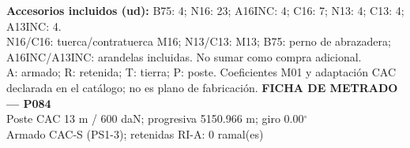 \begingroup\scriptsize
\textbf{Accesorios incluidos (ud):} B75: 4; N16: 23; A16INC: 4; C16: 7; N13: 4; C13: 4; A13INC: 4.\\
N16/C16: tuerca/contratuerca M16; N13/C13: M13; B75: perno de abrazadera; A16INC/A13INC: arandelas incluidas. No sumar como compra adicional.\\
A: armado; R: retenida; T: tierra; P: poste. Coeficientes M01 y adaptación CAC declarada en el catálogo; no es plano de fabricación.
\endgroup\endgroup
\clearpage{}
\begingroup\small\setlength{\parskip}{3pt}\renewcommand{\arraystretch}{1.05}
\textbf{\large FICHA DE METRADO — P084}\\[4pt]
Poste CAC 13 m / 600 daN; progresiva 5150.966 m; giro 0.00\ensuremath{^\circ}\\
Armado CAC-S (PS1-3); retenidas RI-A: 0 ramal(es)\\
\begingroup\scriptsize
